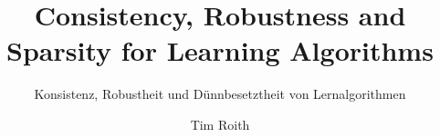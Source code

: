 \usepackage[T1]{fontenc}
\usepackage{lmodern}
\title{Consistency, Robustness and Sparsity for Learning Algorithms}
\subtitle{Konsistenz, Robustheit und Dünnbesetztheit von Lernalgorithmen}
\author{Tim Roith}
\thesistype{}
\setpdfinfo %

\usepackage[NatClassic]{styles/fau-colors}

\usepackage[thmboxing=styleC,
			boxingstyle=styleC,
			chapterheader=styleC, 
			footerheader=styleA,
			]{styles/fau-appearence}
\usepackage{styles/fau-symbols}
%
\usepackage{kantlipsum}
\usepackage[totoc]{idxlayout}
\usepackage[final]{pdfpages}
\usepackage{subcaption}
\usetikzlibrary{positioning}
\usetikzlibrary{shapes.multipart}
\usepackage{wrapfig}

